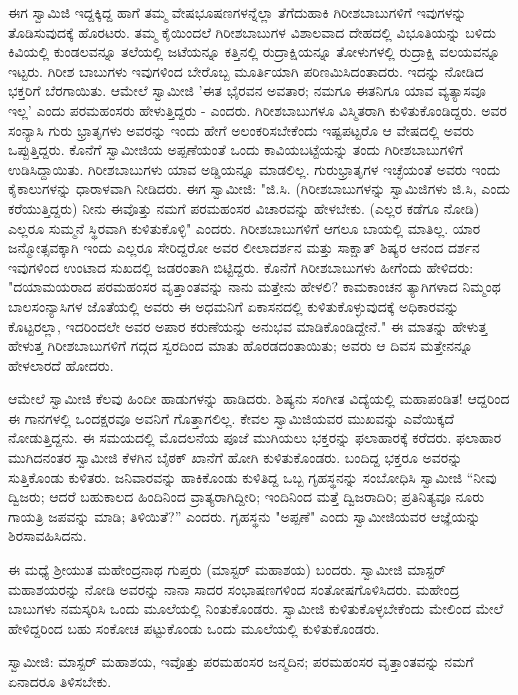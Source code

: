 ಈಗ ಸ್ವಾಮಿಜಿ ಇದ್ದಕ್ಕಿದ್ದ ಹಾಗೆ ತಮ್ಮ ವೇಷಭೂಷಣಗಳನ್ನೆಲ್ಲಾ ತೆಗೆದುಹಾಕಿ ಗಿರೀಶಬಾಬುಗಳಿಗೆ ಇವುಗಳನ್ನು ತೊಡಿಸುವುದಕ್ಕೆ ಹೊರಟರು. ತಮ್ಮ ಕೈಯಿಂದಲೆ ಗಿರೀಶಬಾಬುಗಳ ವಿಶಾಲವಾದ ದೇಹದಲ್ಲಿ ವಿಭೂತಿಯನ್ನು ಬಳಿದು ಕಿವಿಯಲ್ಲಿ ಕುಂಡಲವನ್ನೂ ತಲೆಯಲ್ಲಿ ಜಟೆಯನ್ನೂ ಕತ್ತಿನಲ್ಲಿ ರುದ್ರಾಕ್ಷಿಯನ್ನೂ ತೋಳುಗಳಲ್ಲಿ ರುದ್ರಾಕ್ಷಿ ವಲಯವನ್ನೂ ಇಟ್ಟರು. ಗಿರೀಶ ಬಾಬುಗಳು ಇವುಗಳಿಂದ ಬೇರೊಬ್ಬ ಮೂರ್ತಿಯಾಗಿ ಪರಿಣಮಿಸಿದಂತಾದರು. ಇದನ್ನು ನೋಡಿದ ಭಕ್ತರಿಗೆ ಬೆರಗಾಯಿತು. ಆಮೇಲೆ ಸ್ವಾಮೀಜಿ 'ಈತ ಭೈರವನ ಅವತಾರ; ನಮಗೂ ಈತನಿಗೂ ಯಾವ ವ್ಯತ್ಯಾಸವೂ ಇಲ್ಲ' ಎಂದು ಪರಮಹಂಸರು ಹೇಳುತ್ತಿದ್ದರು - ಎಂದರು. ಗಿರೀಶಬಾಬುಗಳೂ ವಿಸ್ಮಿತರಾಗಿ ಕುಳಿತುಕೊಂಡಿದ್ದರು. ಅವರ ಸಂನ್ಯಾಸಿ ಗುರು ಭ್ರಾತೃಗಳು ಅವರನ್ನು ಇಂದು ಹೇಗೆ ಅಲಂಕರಿಸಬೇಕೆಂದು ಇಷ್ಟಪಟ್ಟರೊ ಆ ವೇಷದಲ್ಲಿ ಅವರು ಒಪ್ಪುತ್ತಿದ್ದರು. ಕೊನೆಗೆ ಸ್ವಾಮೀಜಿಯ ಅಪ್ಪಣೆಯಂತೆ ಒಂದು ಕಾವಿಯಬಟ್ಟೆಯನ್ನು ತಂದು ಗಿರೀಶಬಾಬುಗಳಿಗೆ ಉಡಿಸಿದ್ದಾಯಿತು. ಗಿರೀಶಬಾಬುಗಳು ಯಾವ ಅಡ್ಡಿಯನ್ನೂ ಮಾಡಲಿಲ್ಲ. ಗುರುಭ್ರಾತೃಗಳ ಇಚ್ಛೆಯಂತೆ ಅವರು ಇಂದು ಕೈಕಾಲುಗಳನ್ನು ಧಾರಾಳವಾಗಿ ನೀಡಿದರು. ಈಗ ಸ್ವಾಮೀಜಿ: "ಜಿ.ಸಿ. (ಗಿರೀಶಬಾಬುಗಳನ್ನು ಸ್ವಾಮಿಜಿಗಳು ಜಿ.ಸಿ, ಎಂದು ಕರೆಯುತ್ತಿದ್ದರು) ನೀನು ಈವೊತ್ತು ನಮಗೆ ಪರಮಹಂಸರ ವಿಚಾರವನ್ನು ಹೇಳಬೇಕು. (ಎಲ್ಲರ ಕಡೆಗೂ ನೋಡಿ) ಎಲ್ಲರೂ ಸುಮ್ಮನೆ ಸ್ಥಿರವಾಗಿ ಕುಳಿತುಕೊಳ್ಳಿ" ಎಂದರು. ಗಿರೀಶಬಾಬುಗಳಿಗೆ ಆಗಲೂ ಬಾಯಲ್ಲಿ ಮಾತಿಲ್ಲ. ಯಾರ ಜನ್ಮೋತ್ಸವಕ್ಕಾಗಿ ಇಂದು ಎಲ್ಲರೂ ಸೇರಿದ್ದರೋ ಅವರ ಲೀಲಾದರ್ಶನ ಮತ್ತು ಸಾಕ್ಷಾತ್ ಶಿಷ್ಯರ ಆನಂದ ದರ್ಶನ ಇವುಗಳಿಂದ ಉಂಟಾದ ಸುಖದಲ್ಲಿ ಜಡರಂತಾಗಿ ಬಿಟ್ಟಿದ್ದರು. ಕೊನೆಗೆ ಗಿರೀಶಬಾಬುಗಳು ಹೀಗೆಂದು ಹೇಳಿದರು: "ದಯಾಮಯರಾದ ಪರಮಹಂಸರ ವೃತ್ತಾಂತವನ್ನು ನಾನು ಮತ್ತೇನು ಹೇಳಲಿ? ಕಾಮಕಾಂಚನ ತ್ಯಾಗಿಗಳಾದ ನಿಮ್ಮಂಥ ಬಾಲಸಂನ್ಯಾಸಿಗಳ ಜೊತೆಯಲ್ಲಿ ಅವರು ಈ ಅಧಮನಿಗೆ ಏಕಾಸನದಲ್ಲಿ ಕುಳಿತುಕೊಳ್ಳುವುದಕ್ಕೆ ಅಧಿಕಾರವನ್ನು ಕೊಟ್ಟರಲ್ಲಾ, ಇದರಿಂದಲೇ ಅವರ ಅಪಾರ ಕರುಣೆಯನ್ನು ಅನುಭವ ಮಾಡಿಕೊಂಡಿದ್ದೇನೆ." ಈ ಮಾತನ್ನು ಹೇಳುತ್ತ ಹೇಳುತ್ತ ಗಿರೀಶಬಾಬುಗಳಿಗೆ ಗದ್ಗದ ಸ್ವರದಿಂದ ಮಾತು ಹೊರಡದಂತಾಯಿತು; ಅವರು ಆ ದಿವಸ ಮತ್ತೇನನ್ನೂ ಹೇಳಲಾರದೆ ಹೋದರು.

ಆಮೇಲೆ ಸ್ವಾಮೀಜಿ ಕೆಲವು ಹಿಂದೀ ಹಾಡುಗಳನ್ನು ಹಾಡಿದರು. ಶಿಷ್ಯನು ಸಂಗೀತ ವಿದ್ಯೆಯಲ್ಲಿ ಮಹಾಪಂಡಿತ! ಆದ್ದರಿಂದ ಈ ಗಾನಗಳಲ್ಲಿ ಒಂದಕ್ಷರವೂ ಅವನಿಗೆ ಗೊತ್ತಾಗಲಿಲ್ಲ. ಕೇವಲ ಸ್ವಾಮಿಜಿಯವರ ಮುಖವನ್ನು ಎವೆಯಿಕ್ಕದೆ ನೋಡುತ್ತಿದ್ದನು. ಈ ಸಮಯದಲ್ಲಿ ಮೊದಲನೆಯ ಪೂಜೆ ಮುಗಿಯಲು ಭಕ್ತರನ್ನು ಫಲಾಹಾರಕ್ಕೆ ಕರೆದರು. ಫಲಾಹಾರ ಮುಗಿದನಂತರ ಸ್ವಾಮೀಜಿ ಕೆಳಗಿನ ಬೈಠಕ್ ಖಾನೆಗೆ ಹೋಗಿ ಕುಳಿತುಕೊಂಡರು. ಬಂದಿದ್ದ ಭಕ್ತರೂ ಅವರನ್ನು ಸುತ್ತಿಕೊಂಡು ಕುಳಿತರು. ಜನಿವಾರವನ್ನು ಹಾಕಿಕೊಂಡು ಕುಳಿತಿದ್ದ ಒಬ್ಬ ಗೃಹಸ್ಥನನ್ನು ಸಂಬೋಧಿಸಿ ಸ್ವಾಮೀಜಿ “ನೀವು ದ್ವಿಜರು; ಆದರೆ ಬಹುಕಾಲದ ಹಿಂದಿನಿಂದ ವ್ರಾತ್ಯರಾಗಿದ್ದೀರಿ; ಇಂದಿನಿಂದ ಮತ್ತೆ ದ್ವಿಜರಾದಿರಿ; ಪ್ರತಿನಿತ್ಯವೂ ನೂರು ಗಾಯತ್ರಿ ಜಪವನ್ನು ಮಾಡಿ; ತಿಳಿಯಿತೆ?” ಎಂದರು. ಗೃಹಸ್ಥನು "ಅಪ್ಪಣೆ" ಎಂದು ಸ್ವಾಮೀಜಿಯವರ ಆಜ್ಞೆಯನ್ನು ಶಿರಸಾವಹಿಸಿದನು.

ಈ ಮಧ್ಯೆ ಶ‍್ರೀಯುತ ಮಹೇಂದ್ರನಾಥ ಗುಪ್ತರು (ಮಾಸ್ಟರ್ ಮಹಾಶಯ) ಬಂದರು. ಸ್ವಾಮೀಜಿ ಮಾಸ್ಟರ್ ಮಹಾಶಯರನ್ನು ನೋಡಿ ಅವರನ್ನು ನಾನಾ ಸಾದರ ಸಂಭಾಷಣಗಳಿಂದ ಸಂತೋಷಗೊಳಿಸಿದರು. ಮಹೇಂದ್ರ ಬಾಬುಗಳು ನಮಸ್ಕರಿಸಿ ಒಂದು ಮೂಲೆಯಲ್ಲಿ ನಿಂತುಕೊಂಡರು. ಸ್ವಾಮೀಜಿ ಕುಳಿತುಕೊಳ್ಳಬೇಕೆಂದು ಮೇಲಿಂದ ಮೇಲೆ ಹೇಳಿದ್ದರಿಂದ ಬಹು ಸಂಕೋಚ ಪಟ್ಟುಕೊಂಡು ಒಂದು ಮೂಲೆಯಲ್ಲಿ ಕುಳಿತುಕೊಂಡರು.

ಸ್ವಾಮೀಜಿ: ಮಾಸ್ಟರ್ ಮಹಾಶಯ, ಇವೊತ್ತು ಪರಮಹಂಸರ ಜನ್ಮದಿನ; ಪರಮಹಂಸರ ವೃತ್ತಾಂತವನ್ನು ನಮಗೆ ಏನಾದರೂ ತಿಳಿಸಬೇಕು.

